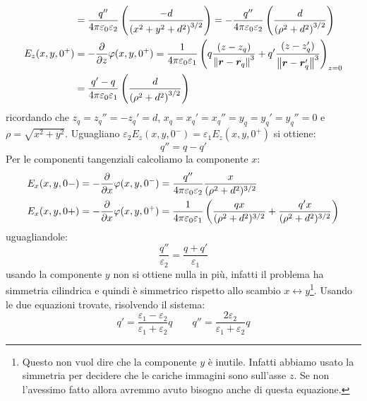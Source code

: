 \begin{Es}
\begin{equation*}
\begin{aligned}
                   & =\frac{q''}{4\pi\varepsilon_0\varepsilon_2}\left(\frac{-d}{\left(x^2+y^2+d^2\right)^{3/2}}\right)
      =-\frac{q''}{4\pi\varepsilon_0\varepsilon_2}\left(\frac{d}{\left(\rho^2+d^2\right)^{3/2}}\right)                                                                                                              \\
      E_z(x,y,0^+) & = -\frac{\partial}{\partial z}\varphi(x,y,0^+) = \frac{1}{4\pi\varepsilon_0\varepsilon_1}\left(q\frac{(z-z_q)}{\left\lVert\boldsymbol{r}-\boldsymbol{r}_q\right\rVert^3}+q'\frac{(z-z_q')}{\left\lVert\boldsymbol{r}-\boldsymbol{r}_q'\right\rVert^3}\right)_{z=0} \\
                   & =\frac{q'-q}{4\pi\varepsilon_0\varepsilon_1}\left(\frac{d}{\left(\rho^2+d^2\right)^{3/2}}\right)
    \end{aligned}
  \end{equation*}
  ricordando che $z_q=z_q''=-z_q' = d$, $x_q=x_q'=x_q''=y_q=y_q'=y_q''=0$ e $\rho = \sqrt{x^2+y^2}$. Uguagliano $\varepsilon_2E_z(x,y,0^-)=\varepsilon_1E_z(x,y,0^+)$ si ottiene:
  \[
    q''=q-q'
  \]
  Per le componenti tangenziali calcoliamo la componente $x$:
  \begin{equation*}
    \begin{aligned}
      E_x(x,y,0-) & = -\frac{\partial}{\partial x}\varphi(x,y,0^-) = \frac{q''}{4\pi\varepsilon_0\varepsilon_2}\frac{x}{(\rho^2+d^2)^{3/2}}                                            \\
      E_x(x,y,0+) & = -\frac{\partial}{\partial x}\varphi(x,y,0^+) = \frac{1}{4\pi\varepsilon_0\varepsilon_1}\left(\frac{qx}{(\rho^2+d^2)^{3/2}}+\frac{q'x}{(\rho^2+d^2)^{3/2}}\right)
    \end{aligned}
  \end{equation*}
  uguagliandole:
  \[
    \frac{q''}{\varepsilon_2}=\frac{q+q'}{\varepsilon_1}
  \]
  usando la componente $y$ non si ottiene nulla in più, infatti il problema ha simmetria cilindrica e quindi è simmetrico rispetto allo scambio $x\leftrightarrow y$\footnote{Questo non vuol dire che la componente $y$ è inutile. Infatti abbiamo usato la simmetria per decidere che le cariche immagini sono sull'asse $z$. Se non l'avessimo fatto allora avremmo avuto bisogno anche di questa equazione.}. Usando le due equazioni trovate, risolvendo il sistema:
  \[
    q' = \frac{\varepsilon_1-\varepsilon_2}{\varepsilon_1+\varepsilon_2}q\qquad q'' = \frac{2\varepsilon_2}{\varepsilon_1+\varepsilon_2}q
  \]


\end{Es}
